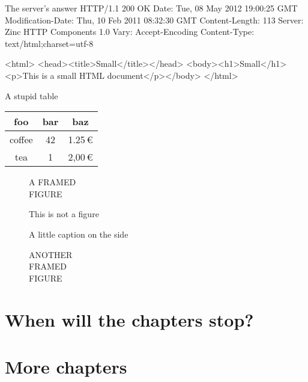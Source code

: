 \documentclass{sbabook}
\begin{document}
\begin{script}{The server's answer}
HTTP/1.1 200 OK
Date: Tue, 08 May 2012 19:00:25 GMT
Modification-Date: Thu, 10 Feb 2011 08:32:30 GMT
Content-Length: 113
Server: Zinc HTTP Components 1.0
Vary: Accept-Encoding
Content-Type: text/html;charset=utf-8

<html>
<head><title>Small</title></head>
<body><h1>Small</h1><p>This is a small HTML document</p></body>
</html>
\end{script}

\begin{table}[p]
    \begin{sidecaption}{A stupid table}
        \begin{tabular}{ccc}
            \toprule
            foo & bar & baz \\
            \midrule
            coffee & 42 & 1.25\,€ \\
            tea & 1 & 2,00\,€ \\
            \bottomrule
        \end{tabular}
    \end{sidecaption}
\end{table}

\begin{figure}[p]
    \begin{framed}
        A FRAMED\\
        FIGURE
    \end{framed}
    \caption{This is not a figure}
\end{figure}

\begin{figure}[p]
    \begin{sidecaption}{A little caption on the side}
        \begin{shaded}
            ANOTHER\\
            FRAMED\\
            FIGURE
        \end{shaded}
    \end{sidecaption}
\end{figure}


\chapter{When will the chapters stop?}

\chapter{More chapters}
\end{document}
